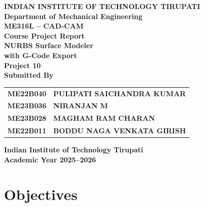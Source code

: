 \documentclass[a4paper,12pt]{article}
\begin{document}
\begin{titlepage}
  \centering
  \vspace*{0.6cm}

  {\Large\bfseries INDIAN INSTITUTE OF TECHNOLOGY TIRUPATI}\\[0.3cm]
  {\large\bfseries Department of Mechanical Engineering}\\[1.4cm]

  {\large\bfseries ME316L -- CAD-CAM}\\[0.2cm]
  {\Large\bfseries Course Project Report}\\[1.0cm]

  {\LARGE\bfseries NURBS Surface Modeler}\\[0.25cm]
  {\Large\bfseries with G-Code Export}\\[1.4cm]

  {\large\bfseries Project 10}\\[1.6cm]

  {\large\bfseries Submitted By}\\[0.6cm]

  \begin{tabular}{>{\bfseries}l >{\bfseries}l}
    ME22B040 & PULIPATI SAICHANDRA KUMAR       \\[4pt]
    ME23B036 & NIRANJAN M                      \\[4pt]
    ME23B028 & MAGHAM RAM CHARAN               \\[4pt]
    ME22B011 & BODDU NAGA VENKATA GIRISH       \\
  \end{tabular}

  \vfill
  {\small\bfseries Indian Institute of Technology Tirupati}\\[0.2cm]
  {\small\bfseries Academic Year 2025--2026}
\end{titlepage}

\clearpage

\renewcommand{\contentsname}{\Large\bfseries Contents}
\tableofcontents
\clearpage

\section{Objectives}
\end{document}

